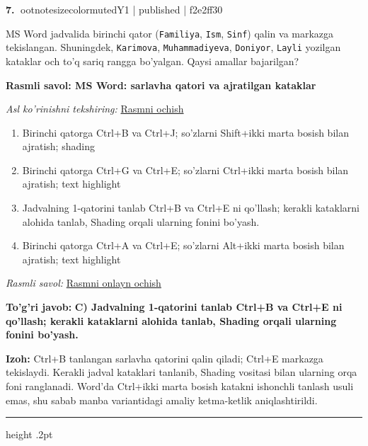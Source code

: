 \documentclass[10pt,a4paper]{article}
\begin{document}
\textbf{\color{ink}7.} {ootnotesizecolor{muted}Y1 | published | f2e2ff30}
\par
MS Word jadvalida birinchi qator (\texttt{Familiya}, \texttt{Ism}, \texttt{Sinf}) qalin va markazga tekislangan. Shuningdek, \texttt{Karimova}, \texttt{Muhammadiyeva}, \texttt{Doniyor}, \texttt{Layli} yozilgan kataklar och to'q sariq rangga bo'yalgan. Qaysi amallar bajarilgan?
\begin{center}\begin{tcolorbox}[colback=gray!4,colframe=teal!55!black,width=.94\linewidth,arc=1mm,boxrule=.4pt]
\textbf{Rasmli savol: MS Word: sarlavha qatori va ajratilgan kataklar}
\par\smallskip\textit{Asl ko'rinishni tekshiring: }\href{https://github.com/sarvar9417/attestatsiya/blob/main/public/kuzgi-demo/demo_q19_wordtable.svg}{Rasmni ochish}
\end{tcolorbox}\end{center}
\begin{enumerate}[label=\Alph*),leftmargin=9mm]
\item Birinchi qatorga Ctrl+B va Ctrl+J; so'zlarni Shift+ikki marta bosish bilan ajratish; shading
\item Birinchi qatorga Ctrl+G va Ctrl+E; so'zlarni Ctrl+ikki marta bosish bilan ajratish; text highlight
\item Jadvalning 1-qatorini tanlab Ctrl+B va Ctrl+E ni qo'llash; kerakli kataklarni alohida tanlab, Shading orqali ularning fonini bo'yash.
\item Birinchi qatorga Ctrl+A va Ctrl+E; so'zlarni Alt+ikki marta bosish bilan ajratish; text highlight
\end{enumerate}
\par\smallskip\textit{Rasmli savol: }\href{https://github.com/sarvar9417/attestatsiya/blob/main/public/kuzgi-demo/demo_q19_wordtable.svg}{Rasmni onlayn ochish}
\begin{tcolorbox}[enhanced,breakable,colback=teal!4,colframe=teal!55!black,boxrule=0.45pt,arc=1.2mm,left=2.8mm,right=2.8mm,top=2mm,bottom=2mm]
\textbf{\color{teal}To'g'ri javob:} \textbf{C) Jadvalning 1-qatorini tanlab Ctrl+B va Ctrl+E ni qo'llash; kerakli kataklarni alohida tanlab, Shading orqali ularning fonini bo'yash.}
\par\smallskip
\textbf{Izoh:} Ctrl+B tanlangan sarlavha qatorini qalin qiladi; Ctrl+E markazga tekislaydi. Kerakli jadval kataklari tanlanib, Shading vositasi bilan ularning orqa foni ranglanadi. Word'da Ctrl+ikki marta bosish katakni ishonchli tanlash usuli emas, shu sabab manba variantidagi amaliy ketma-ketlik aniqlashtirildi.
\end{tcolorbox}
\vspace{2mm}\hrule height .2pt\vspace{2mm}
\end{document}
